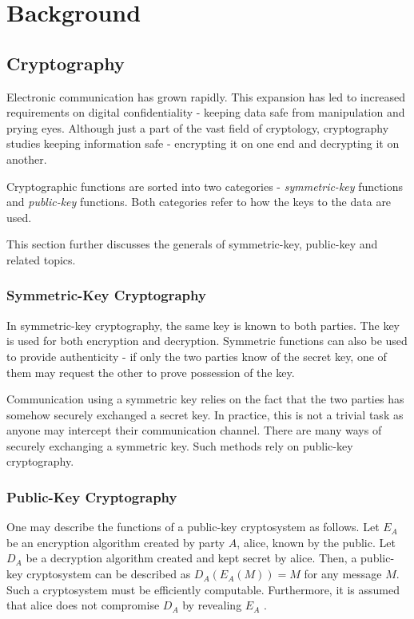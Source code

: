 \chapter{Background}
\label{chapter:background}

\section{Cryptography}

Electronic communication has grown rapidly. This expansion has led to increased requirements on digital confidentiality - keeping data safe from manipulation and prying eyes. Although just a part of the vast field of cryptology, cryptography studies keeping information safe - encrypting it on one end and decrypting it on another\cite{delfs2007}.

Cryptographic functions are sorted into two categories - \textit{symmetric-key} functions and \textit{public-key} functions. Both categories refer to how the keys to the data are used\cite{bernstein2017}.

This section further discusses the generals of symmetric-key, public-key and related topics.

\subsection{Symmetric-Key Cryptography}

In symmetric-key cryptography, the same key is known to both parties. The key is used for both encryption and decryption. Symmetric functions can also be used to provide authenticity - if only the two parties know of the secret key, one of them may request the other to prove possession of the key\cite{bernstein2017}.

Communication using a symmetric key relies on the fact that the two parties has somehow securely exchanged a secret key. In practice, this is not a trivial task as anyone may intercept their communication channel\cite{delfs2007}. There are many ways of securely exchanging a symmetric key. Such methods rely on public-key cryptography\cite{delfs2007}.

\subsection{Public-Key Cryptography}
\label{section:background:public-key-cryptography}

One may describe the functions of a public-key cryptosystem as follows. Let $E_A$ be an encryption algorithm created by party $A$, \gls{alice}, known by the public. Let $D_A$ be a decryption algorithm created and kept secret by \gls{alice}. Then, a public-key cryptosystem can be described as $D_A(E_A(M))=M$ for any message $M$. Such a cryptosystem must be efficiently computable. Furthermore, it is assumed that \gls{alice} does not compromise $D_A$ by revealing $E_A$ \cite{rsa1977}.

